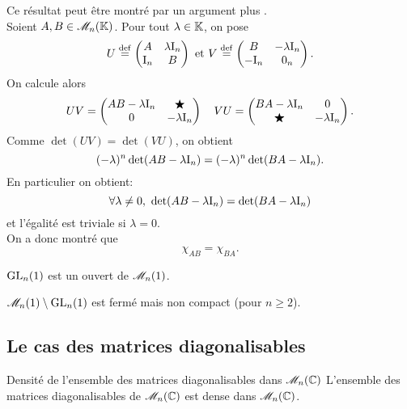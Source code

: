 Ce résultat peut être montré par un argument plus . \\
Soient $A, B \in \mathscr{M}_n(\mathbb{K})$. Pour tout $\lambda \in \mathbb{K}$, on pose
$$
U \overset{\mathrm{\tiny def}}{=}
\begin{pmatrix}
    A & \lambda \mathrm{I}_n \\
    \mathrm{I}_n & B
\end{pmatrix}
\text{ et }
V \overset{\mathrm{\tiny def}}{=} 
\begin{pmatrix}
    B & -\lambda \mathrm{I}_n \\
    -\mathrm{I}_n & 0_n
\end{pmatrix}.
$$
On calcule alors
$$UV = 
\begin{pmatrix}
    AB - \lambda \mathrm{I}_n & \bigstar \\
    0 & -\lambda \mathrm{I}_n
\end{pmatrix}
\quad
VU = 
\begin{pmatrix}
    BA - \lambda \mathrm{I}_n & 0 \\
    \bigstar & -\lambda \mathrm{I}_n
\end{pmatrix}.
$$
Comme $\det(UV) = \det(VU)$, on obtient
$$(-\lambda)^n \det(AB - \lambda \mathrm{I}_n) = (-\lambda)^n \det(BA - \lambda \mathrm{I}_n).$$
En particulier on obtient:
$$\forall \lambda \not= 0,\ \det(AB - \lambda \mathrm{I}_n) = \det(BA - \lambda \mathrm{I}_n)$$
et l'égalité est triviale si $\lambda = 0$. \\
On a donc montré que 
$$\chi_{A B} = \chi_{B A}.$$

\begin{prop}{}
    $\mathrm{GL}_n(1)$ est un ouvert de $\mathscr{M}_n(1)$.
\end{prop}

\begin{prop}{}
    $\mathscr{M}_n(1) \setminus \mathrm{GL}_n(1)$ est fermé mais non compact (pour $n \geqslant 2$).
\end{prop}

\subsection{Le cas des matrices diagonalisables}

\begin{theo}{Densité de l'ensemble des matrices diagonalisables dans  $\mathscr{M}_n(\mathbb{C})$}
    L'ensemble des matrices diagonalisables de $\mathscr{M}_n(\mathbb{C})$ est dense dans $\mathscr{M}_n(\mathbb{C})$.
\end{theo}

